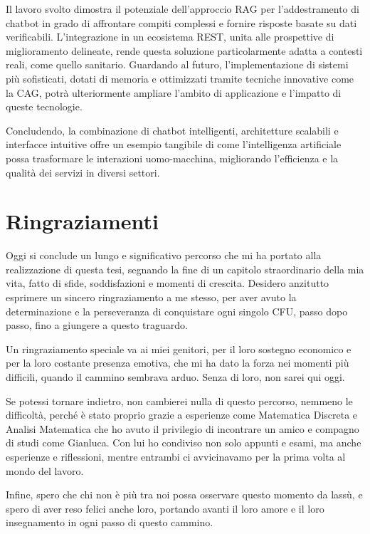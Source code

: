 \documentclass[a4paper,twoside,12pt]{toptesi}
\begin{document}
Il lavoro svolto dimostra il potenziale dell'approccio RAG per l'addestramento di chatbot in grado di affrontare compiti complessi e fornire risposte basate su dati verificabili. L'integrazione in un ecosistema REST, unita alle prospettive di miglioramento delineate, rende questa soluzione particolarmente adatta a contesti reali, come quello sanitario. Guardando al futuro, l'implementazione di sistemi più sofisticati, dotati di memoria e ottimizzati tramite tecniche innovative come la CAG, potrà ulteriormente ampliare l'ambito di applicazione e l'impatto di queste tecnologie.

Concludendo, la combinazione di chatbot intelligenti, architetture scalabili e interfacce intuitive offre un esempio tangibile di come l'intelligenza artificiale possa trasformare le interazioni uomo-macchina, migliorando l'efficienza e la qualità dei servizi in diversi settori.

\chapter*{Ringraziamenti}
Oggi si conclude un lungo e significativo percorso che mi ha portato alla realizzazione di questa tesi, segnando la fine di un capitolo straordinario della mia vita, fatto di sfide, soddisfazioni e momenti di crescita. Desidero anzitutto esprimere un sincero ringraziamento a me stesso, per aver avuto la determinazione e la perseveranza di conquistare ogni singolo CFU, passo dopo passo, fino a giungere a questo traguardo.

Un ringraziamento speciale va ai miei genitori, per il loro sostegno economico e per la loro costante presenza emotiva, che mi ha dato la forza nei momenti più difficili, quando il cammino sembrava arduo. Senza di loro, non sarei qui oggi.

Se potessi tornare indietro, non cambierei nulla di questo percorso, nemmeno le difficoltà, perché è stato proprio grazie a esperienze come Matematica Discreta e Analisi Matematica che ho avuto il privilegio di incontrare un amico e compagno di studi come Gianluca. Con lui ho condiviso non solo appunti e esami, ma anche esperienze e riflessioni, mentre entrambi ci avvicinavamo per la prima volta al mondo del lavoro.

Infine, spero che chi non è più tra noi possa osservare questo momento da lassù, e spero di aver reso felici anche loro, portando avanti il loro amore e il loro insegnamento in ogni passo di questo cammino.
\end{document}
